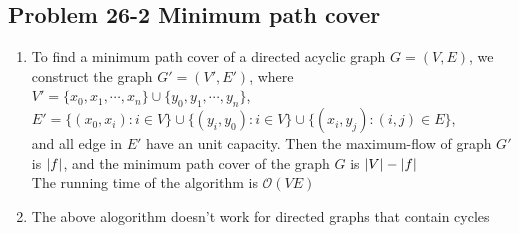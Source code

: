 \subsection*{Problem 26-2 Minimum path cover}
\begin{enumerate}
	\item	To find a minimum path cover of a directed acyclic graph $G = (V, E)$, we construct the graph $G' = (V', E')$, where \\
		$V' = \{x_0, x_1, \cdots, x_n\} \cup \{y_0, y_1, \cdots, y_n\}$, \\
		$E' = \{(x_0, x_i):i \in V\} \cup \{(y_i, y_0):i \in V\} \cup \{(x_i, y_j):(i, j) \in E\}$, \\
		and all edge in $E'$ have an unit capacity. Then the maximum-flow of graph $G'$ is $\left\lvert f \right\rvert$, and the minimum path cover of the graph $G$ is $\left\lvert V \right\rvert - \left\lvert f \right\rvert$ \\
		The running time of the algorithm is $\mathcal{O}(VE)$
	\item	The above alogorithm doesn't work for directed graphs that contain cycles
\end{enumerate}

